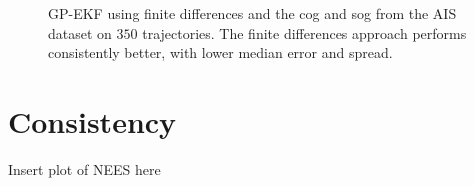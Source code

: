 \begin{figure}
    \centering
    \caption{GP-EKF using finite differences and the \acrshort{cog} and \acrshort{sog} from the AIS dataset on $350$ trajectories. The finite differences approach performs consistently better, with lower median error and spread.}
    \label{fig:stats_curved_gp_ekf_fd_vs_cog}
\end{figure}




\section{Consistency}
Insert plot of NEES here


